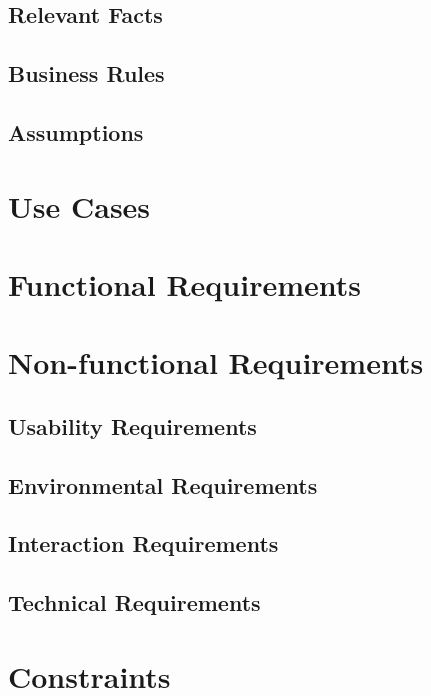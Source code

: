 \documentclass[12pt,a4paper]{article}
\begin{document}
\subsection{Relevant Facts}
\subsection{Business Rules}
\subsection{Assumptions}


\pagebreak
\section{Use Cases}
\pagebreak
\section{Functional Requirements}
\pagebreak
\section{Non-functional Requirements}
\subsection{Usability Requirements}
\subsection{Environmental Requirements}
\subsection{Interaction Requirements}
\subsection{Technical Requirements}
\pagebreak
\section{Constraints}
\end{document}
